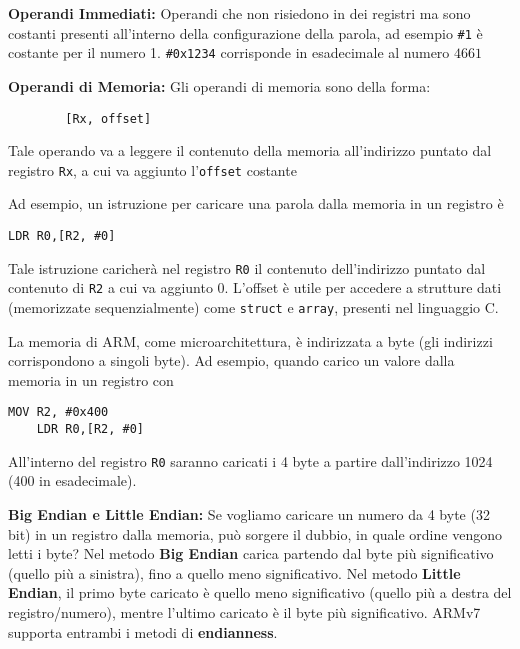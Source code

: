 \begin{defn}
	\textbf{Operandi Immediati:}
	Operandi che non risiedono in dei registri ma sono costanti presenti all'interno della configurazione della parola, ad esempio \verb|#1| è costante per il numero 1. \verb|#0x1234| corrisponde in esadecimale al numero $ 4661 $
\end{defn}

\begin{defn}
	\textbf{Operandi di Memoria:}
	Gli operandi di memoria sono della forma:
	\begin{lstlisting}
		[Rx, offset]
	\end{lstlisting}
	
	Tale operando va a leggere il contenuto della memoria all'indirizzo puntato dal registro \verb|Rx|, a cui va aggiunto l'\verb|offset| costante
	
	Ad esempio, un istruzione per caricare una parola dalla memoria in un registro è 
	\begin{lstlisting}[style=arm]
	LDR R0,[R2, #0]
	\end{lstlisting}
	
	Tale istruzione caricherà nel registro \verb|R0| il contenuto dell'indirizzo puntato dal contenuto di \verb|R2| a cui va aggiunto 0. L'offset è utile per accedere a strutture dati (memorizzate sequenzialmente) come \verb|struct| e \verb|array|, presenti nel linguaggio C.
\end{defn}

\begin{note}
	La memoria di ARM, come microarchitettura, è indirizzata a byte (gli indirizzi corrispondono a singoli byte). Ad esempio, quando carico un valore dalla memoria in un registro con
	\begin{lstlisting}[style=arm]
	MOV R2, #0x400
	LDR R0,[R2, #0]
	\end{lstlisting}
	
	All'interno del registro \verb|R0| saranno caricati i 4 byte a partire dall'indirizzo 1024 (400 in esadecimale).
\end{note}

\begin{defn}
	\textbf{Big Endian e Little Endian:} Se vogliamo caricare un numero da 4 byte (32 bit) in un registro dalla memoria, può sorgere il dubbio, in quale ordine vengono letti i byte? Nel metodo \textbf{Big Endian} carica partendo dal byte più significativo (quello più a sinistra), fino a quello meno significativo. Nel metodo \textbf{Little Endian}, il primo byte caricato è quello meno significativo (quello più a destra del registro/numero), mentre l'ultimo caricato è il byte più significativo. ARMv7 supporta entrambi i metodi di \textbf{endianness}.
\end{defn}

